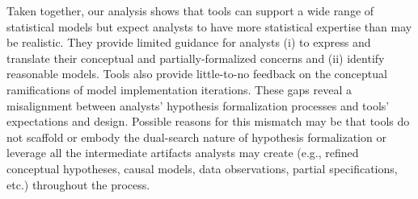 
Taken together, our analysis shows that tools can support a wide range of
statistical models but expect analysts to have more statistical expertise than
may be realistic. They provide limited guidance for analysts (i) to express and
translate their conceptual and partially-formalized concerns and (ii) identify
reasonable models. Tools also provide little-to-no feedback on the conceptual
ramifications of model implementation iterations. These gaps reveal a misalignment
between analysts' hypothesis formalization processes and tools' expectations and
design. Possible reasons for this mismatch may be that tools do not scaffold or
embody the dual-search nature of hypothesis formalization or leverage all the
intermediate artifacts analysts may create (e.g., refined conceptual hypotheses,
causal models, data observations, partial specifications, etc.) throughout the
process.



